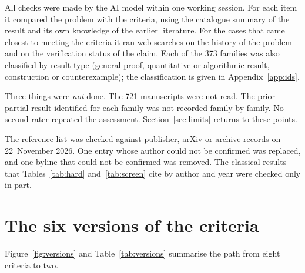 \documentclass[11pt,a4paper]{article}
\theoremstyle{prob}
\begin{document}
All checks were made by the AI model within one working session. For each item it compared the problem with the criteria, using the catalogue summary of the result and its own knowledge of the earlier literature. For the cases that came closest to meeting the criteria it ran web searches on the history of the problem and on the verification status of the claim. Each of the 373 families was also classified by result type (general proof, quantitative or algorithmic result, construction or counterexample); the classification is given in Appendix~\ref{app:ids}.

Three things were \emph{not} done. The 721 manuscripts were not read. The prior partial result identified for each family was not recorded family by family. No second rater repeated the assessment. Section~\ref{sec:limits} returns to these points.

The reference list was checked against publisher, arXiv or archive records on 22~November 2026. One entry whose author could not be confirmed was replaced, and one byline that could not be confirmed was removed. The classical results that Tables~\ref{tab:hard} and~\ref{tab:screen} cite by author and year were checked only in part.

\section{The six versions of the criteria}\label{sec:versions}

Figure~\ref{fig:versions} and Table~\ref{tab:versions} summarise the path from eight criteria to two.
\end{document}
